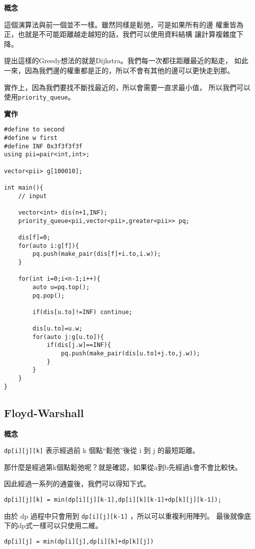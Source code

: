     \textbf{概念}

    這個演算法與前一個並不一樣。雖然同樣是鬆弛，可是如果所有的邊
    權重皆為正，也就是不可能距離越走越短的話，我們可以使用資料結構
    讓計算複雜度下降。

    提出這樣的Greedy想法的就是Dijkstra。我們每一次都往距離最近的點走，
    如此一來，因為我們邊的權重都是正的，所以不會有其他的邊可以更快走到那。

    實作上，因為我們要找不斷找最近的，所以會需要一直求最小值，
    所以我們可以使用\verb|priority_queue|。

    \textbf{實作}

\begin{lstlisting}[caption=Dijkstra 算法]
#define to second
#define w first
#define INF 0x3f3f3f3f
using pii=pair<int,int>;

vector<pii> g[100010];

int main(){
    // input

    vector<int> dis(n+1,INF);
    priority_queue<pii,vector<pii>,greater<pii>> pq;

    dis[f]=0;
    for(auto i:g[f]){
        pq.push(make_pair(dis[f]+i.to,i.w));
    }

    for(int i=0;i<n-1;i++){
        auto u=pq.top();
        pq.pop();

        if(dis[u.to]!=INF) continue;

        dis[u.to]=u.w;
        for(auto j:g[u.to]){
            if(dis[j.w]==INF){
                pq.push(make_pair(dis[u.to]+j.to,j.w));
            }
        }
    }
}
\end{lstlisting}

    \subsection{Floyd-Warshall}

    \textbf{概念}

    \verb|dp[i][j][k]| 表示經過前 k 個點``鬆弛''後從 i 到 j 的最短距離。

    那什麼是經過第k個點鬆弛呢？就是確認，如果從a到b先經過k會不會比較快。
    
    因此經過一系列的通靈後，我們可以得知下式。
    
    \verb|dp[i][j][k] = min(dp[i][j][k-1],dp[i][k][k-1]+dp[k][j][k-1]);|
    
    由於 dp 過程中只會用到 \verb|dp[i][j][k-1]| ，所以可以重複利用陣列。
    最後就像底下的dp式一樣可以只使用二維。

    \verb|dp[i][j] = min(dp[i][j],dp[i][k]+dp[k][j])|

